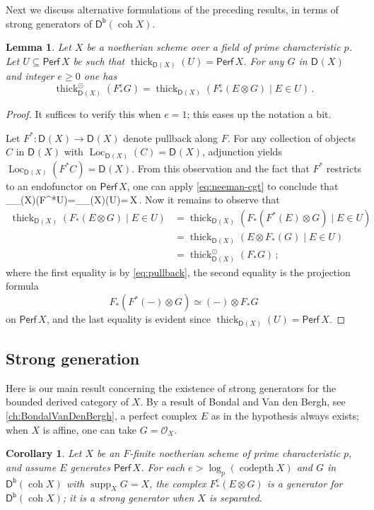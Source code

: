 \documentclass{amsart}
\let\oldequation\equation
\let\oldendequation\endequation
\renewenvironment{equation}{\linenomathNonumbers\oldequation}{\oldendequation\endlinenomath}
\renewenvironment{align*}{\linenomathNonumbers\oldalignstar}{\oldendalignstar\endlinenomath}
\newcommand{\dcat}[2][]{\cat{D}_{#1}(#2)}
\newcommand{\perf}[1]{\mathsf{Perf}\,#1}
\newcommand{\coh}{\operatorname{coh}}
\newcommand{\dbcat}[1]{\cat{D}^{\mathsf{b}}(#1)}
\newcommand{\mco}{\mathcal{O}}
\newcommand{\cat}[1]{{\mathsf{#1}}}
\newcommand{\codepth}{\operatorname{codepth}}
\newcommand{\Loc}{\operatorname{Loc}}
\newcommand{\supp}{\operatorname{supp}}
\newcommand{\thick}{\operatorname{thick}}
\newtheorem{lemma}[subsection]{Lemma}
\newtheorem{corollary}[subsection]{Corollary}
\theoremstyle{definition}
\theoremstyle{remark}
\numberwithin{equation}{subsection}
\begin{document}
Next we discuss alternative formulations of the preceding results, in terms of strong generators of $\dbcat{\coh X}$.

\begin{lemma}
\label{le:thick-Frobenius}
Let $X$ be a noetherian scheme over a field of prime characteristic $p$. Let $U\subseteq \perf X$ be such that $\thick_{\dcat X}(U)=\perf X$. For any $G$ in $\dcat X$ and integer $e\ge 0$ one has
\[
\thick^{\odot}_{\dcat X}(F ^e_*G) 
 = \thick_{\dcat X}(F ^e_*(E\otimes G)\mid E\in U)\,.
\]
\end{lemma}

\begin{proof}
It suffices to verify this when $e=1$; this eases up the notation a bit. 

Let $F^*\colon \dcat{X}\to \dcat{X}$ denote pullback along $F$. For any collection of objects $C$ in $\dcat X$ with $\Loc_{\dcat X}(C)=\dcat{X}$, adjunction yields $\Loc_{\dcat X}(F^*C)=\dcat{X}$. From this observation and the fact that $F^*$ restricts to an endofunctor on $\perf{X}$, one can apply \cref{eq:neeman-cgt} to conclude that 
\begin{equation}\label{eq:pullback}
\thick_{\dcat X}(F^*U)=\thick_{\dcat X}(U)=\perf{X}\,.
\end{equation}
Now it remains to observe that 
\begin{align*}
 \thick_{\dcat X}(F _*(E\otimes G)\mid E\in U)&=\thick_{\dcat X}(F _*(F^*(E)\otimes G)\mid E\in U)\\
 &=\thick_{\dcat X}(E\otimes F _*(G)\mid E\in U)\\
 &=\thick^{\odot}_{\dcat X}(F_*G)\,;
\end{align*}
where the first equality is by \cref{eq:pullback}, the second equality is the projection formula
\[
F _*(F ^*(-)\otimes G)\simeq (-)\otimes F _*G
\]
on $\perf{X}$, and the last equality is evident since $\thick_{\dcat X}(U)=\perf{X}$. 
\end{proof}

\subsection*{Strong generation}
Here is our main result concerning the existence of strong generators for the bounded derived category of $X$. By a result of Bondal and Van den Bergh, see \cref{ch:BondalVanDenBergh}, a perfect complex $E$ as in the hypothesis always exists; when $X$ is affine, one can take $G=\mco_X$.

\begin{corollary}
\label{co:strong-generation}
Let $X$ be an $F$-finite noetherian scheme of prime characteristic $p$, and assume $E$ generates $\perf X$. For each $e>\log_p(\codepth X)$ and $G$ in $\dbcat{\coh X}$ with $\supp_XG=X$, the complex $F^e_*(E\otimes G)$ is a generator for $\dbcat{\coh X}$; it is a strong generator when $X$ is separated.
\end{corollary}
\end{document}
